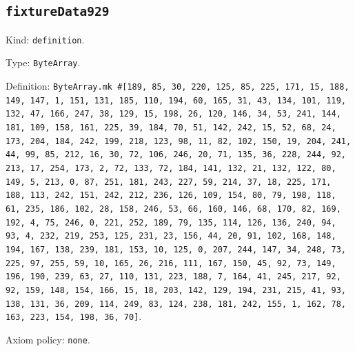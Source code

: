 \documentclass[11pt]{article}
\begin{document}
\subsection*{\texttt{fixtureData929}}
\noindent Kind: \texttt{definition}.\par
\noindent Type: \texttt{ByteArray}.\par
\noindent Definition: \texttt{ByteArray.mk \#[189, 85, 30, 220, 125, 85, 225, 171, 15, 188, 149, 147, 1, 151, 131, 185, 110, 194, 60, 165, 31, 43, 134, 101, 119, 132, 47, 166, 247, 38, 129, 15, 198, 26, 120, 146, 34, 53, 241, 144, 181, 109, 158, 161, 225, 39, 184, 70, 51, 142, 242, 15, 52, 68, 24, 173, 204, 184, 242, 199, 218, 123, 98, 11, 82, 102, 150, 19, 204, 241, 44, 99, 85, 212, 16, 30, 72, 106, 246, 20, 71, 135, 36, 228, 244, 92, 213, 17, 254, 173, 2, 72, 133, 72, 184, 141, 132, 21, 132, 122, 80, 149, 5, 213, 0, 87, 251, 181, 243, 227, 59, 214, 37, 18, 225, 171, 188, 113, 242, 151, 242, 212, 236, 126, 109, 154, 80, 79, 198, 118, 61, 235, 186, 102, 28, 158, 246, 53, 66, 160, 146, 68, 170, 82, 169, 192, 4, 75, 246, 0, 221, 252, 189, 79, 135, 114, 126, 136, 240, 94, 93, 4, 232, 219, 253, 125, 231, 23, 156, 44, 20, 91, 102, 168, 148, 194, 167, 138, 239, 181, 153, 10, 125, 0, 207, 244, 147, 34, 248, 73, 225, 97, 255, 59, 10, 165, 26, 216, 111, 167, 150, 45, 92, 73, 149, 196, 190, 239, 63, 27, 110, 131, 223, 188, 7, 164, 41, 245, 217, 92, 92, 159, 148, 154, 166, 15, 18, 203, 142, 129, 194, 231, 215, 41, 93, 138, 131, 36, 209, 114, 249, 83, 124, 238, 181, 242, 155, 1, 162, 78, 163, 223, 154, 198, 36, 70]}.\par
\noindent Axiom policy: \texttt{none}.\par
\end{document}
